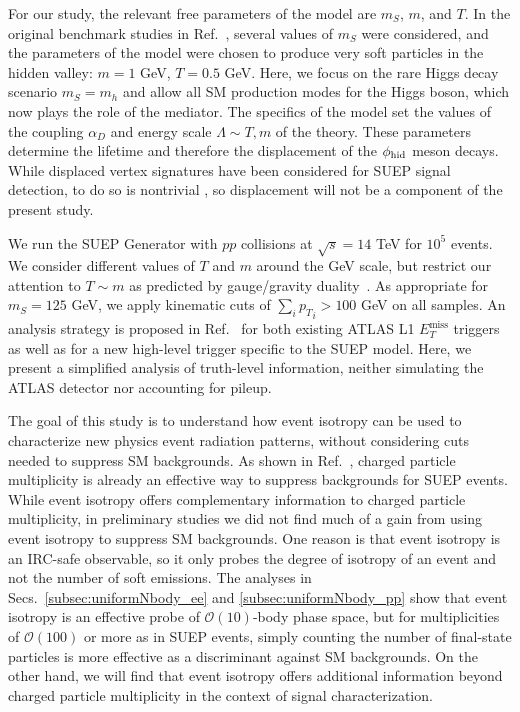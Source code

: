 \documentclass[letterpaper,11pt]{article}
\DeclareRobustCommand{\Secs}[2]{Secs.~\ref{#1} and \ref{#2}}
\DeclareRobustCommand{\Ref}[1]{Ref.~\cite{#1}}
\begin{document}
For our study, the relevant free parameters of the model are $m_S$, $m$, and $T$.
%
In the original benchmark studies in \Ref{Knapen:2016hky}, several values of $m_S$ were considered, and the parameters of the model were chosen to produce very soft particles in the hidden valley:  $m = 1$ GeV, $T = 0.5$ GeV. 
%
Here, we focus on the rare Higgs decay scenario $m_S = m_h$ and allow all SM production modes for the Higgs boson, which now plays the role of the mediator. 
%
The specifics of the model set the values of the coupling $\alpha_D$ and energy scale $\Lambda \sim T, m$ of the theory. 
%
These parameters determine the lifetime and therefore the displacement of the $\phi_{\rm hid}$ meson decays. 
%
While displaced vertex signatures have been considered for SUEP signal detection, to do so is nontrivial \cite{Alimena:2019zri}, so displacement will not be a component of the present study. 


We run the SUEP Generator with $pp$ collisions at $\sqrt{s} = 14$ TeV for $10^5$ events.
%
We consider different values of $T$ and $m$ around the GeV scale, but restrict our attention to $T \sim m$ as predicted by gauge/gravity duality~\cite{Hatta:2008qx}.   
%
As appropriate for $m_S = 125$ GeV, we apply kinematic cuts of $\sum_i {p_T}_i > 100$ GeV on all samples.
%
An analysis strategy is proposed in \Ref{Knapen:2016hky} for both existing ATLAS L1 $E_T^\text{miss}$ triggers as well as for a new high-level trigger specific to the SUEP model.
%
Here, we present a simplified analysis of truth-level information, neither simulating the ATLAS detector nor accounting for pileup. 


The goal of this study is to understand how event isotropy can be used to characterize new physics event radiation patterns, without considering cuts needed to suppress SM backgrounds.
%
As shown in \Ref{Knapen:2016hky}, charged particle multiplicity is already an effective way to suppress backgrounds for SUEP events.
%
While event isotropy offers complementary information to charged particle multiplicity, in preliminary studies we did not find much of a gain from using event isotropy to suppress SM backgrounds. 
%
One reason is that event isotropy is an IRC-safe observable, so it only probes the degree of isotropy of an event and not the number of soft emissions.
%
The analyses in \Secs{subsec:uniformNbody_ee}{subsec:uniformNbody_pp} show that event isotropy is an effective probe of $\mathcal{O}(10)$-body phase space, but for multiplicities of $\mathcal{O}(100)$ or more as in SUEP events, simply counting the number of final-state particles is more effective as a discriminant against SM backgrounds.
%
On the other hand, we will find that event isotropy offers additional information beyond charged particle multiplicity in the context of signal characterization.
\end{document}
